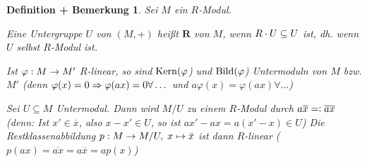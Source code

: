 \documentclass[a4paper,10pt,german]{scrbook}
\theoremstyle{saetze}
\theoremstyle{definitionen}
\newtheorem{DefBem}[Def]{Definition + Bemerkung}
\begin{document}
\begin{DefBem}
Sei $M$ ein $R$-Modul.
\begin{enum}
\item Eine Untergruppe $U$ von $(M,+)$ heißt
$\mathbf{R}$ von $M$, wenn $R\cdot U \subseteq U$
ist, dh. wenn $U$ selbst $R$-Modul ist.

\item Ist $\varphi:M \rightarrow M'$ $R$-linear, so sind $\mathop{\rm Kern}\nolimits(\varphi$) und
$\mathop{\rm Bild}\nolimits(\varphi$) Untermoduln von $M$ bzw. $M'$ (denn $\varphi(x) = 0
\Rightarrow \varphi(ax)=0 \forall \dots$ und $a\varphi(x) = \varphi(ax)
\forall \dots$)

\item Sei $U \subseteq M$ Untermodul.
\newline Dann wird $M/U$ zu einem $R$-Modul durch $a \overline{x} =\mathrel{\mathop:}
\overline{ax}$ (denn: Ist $x' \in \overline{x}$, also $x-x' \in U$, so ist $ax'
- ax = a(x' - x) \in U$)
\newline Die Restklassenabbildung $p:M \rightarrow M/U,\;x\mapsto \bar x$
ist dann $R$-linear ($p(ax) = \overline{ax} = a \overline{x} = a p(x)$)
\end{enum}
\end{DefBem}
\end{document}
